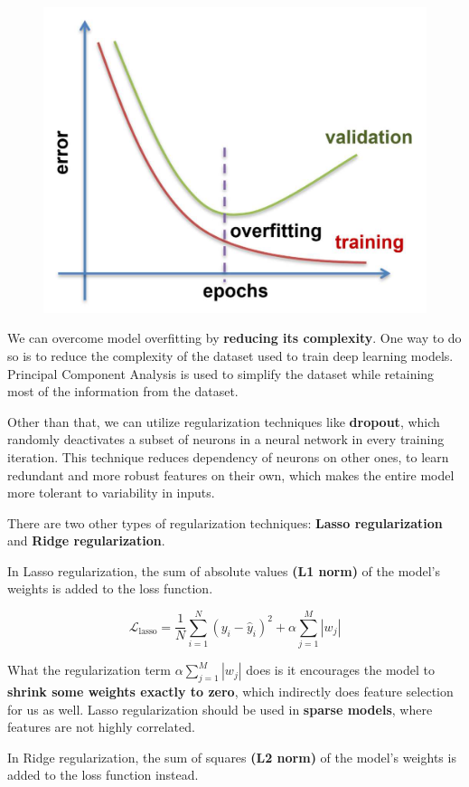 \documentclass[12pt]{article}
\begin{document}
\begin{figure}[h]
\centering
  \includegraphics[width=0.475\linewidth]{images/lecture_04/img_9.png}
  \label{fig:img_9}
\end{figure}

We can overcome model overfitting by \textbf{reducing its complexity}. One way to do so is to reduce the complexity of the dataset used to train deep learning models. Principal Component Analysis is used to simplify the dataset while retaining most of the information from the dataset.
\vspace{1.5em}

Other than that, we can utilize regularization techniques like \textbf{dropout}, which randomly deactivates a subset of neurons in a neural network in every training iteration. This technique reduces dependency of neurons on other ones, to learn redundant and more robust features on their own, which makes the entire model more tolerant to variability in inputs.

\newpage
There are two other types of regularization techniques: \textbf{Lasso regularization} and \textbf{Ridge regularization}.
\vspace{1.5em}

In Lasso regularization, the sum of absolute values \textbf{(L1 norm)} of the model's weights is added to the loss function. 
\vspace{1.0em}

\[
\mathcal{L}_{\text{lasso}} = \frac{1}{N} \sum_{i=1}^{N} (y_i - \hat{y}_i)^2 + \alpha \sum_{j=1}^{M} |w_j|
\]
\vspace{1.0em}

What the regularization term $\alpha \sum_{j=1}^{M} |w_j|$ does is it encourages the model to \textbf{shrink some weights exactly to zero}, which indirectly does feature selection for us as well. Lasso regularization should be used in \textbf{sparse models}, where features are not highly correlated.


In Ridge regularization, the sum of squares \textbf{(L2 norm)} of the model's weights is added to the loss function instead.
\vspace{1.0em}
\end{document}

